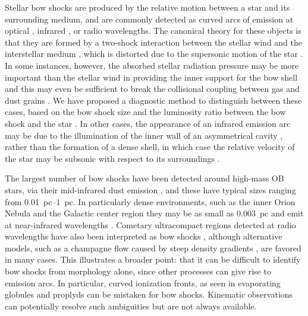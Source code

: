 \documentclass[useAMS, usenatbib, a4paper]{mnras}
\newcommand\hii{\ion{H}{ii}}
\begin{document}
Stellar bow shocks are produced by the relative motion between a star
and its surrounding medium, and are commonly detected as curved arcs
of emission at optical \citep{Gull:1979a, Brown:2005a}, infrared
\citep{van-Buren:1988a, Kobulnicky:2016a}, or radio
\citep{van-Buren:1990a, Benaglia:2010a} wavelengths.  The canonical
theory for these objects is that they are formed by a two-shock
interaction between the stellar wind and the interstellar medium
\citep{Pikelner:1968a, Dyson:1972a}, which is distorted due to the
supersonic motion of the star \citep{Baranov:1970a, Wilkin:1996a}.  In
some instances, however, the absorbed stellar radiation pressure may
be more important than the stellar wind in providing the inner support
for the bow shell \citep[Paper~I]{Henney:2019a} and this may even be
sufficient to break the collisional coupling between gas and dust
grains \citep[Paper~II]{Henney:2019b}.  We have proposed a diagnostic
method to distinguish between these cases, based on the bow shock size
and the luminosity ratio between the bow shock and the star
\citep[Paper~III]{Henney:2019c}. In other cases, the appearance of an
infrared emission arc may be due to the illumination of the inner wall
of an asymmetrical cavity \citep{Mackey:2016a}, rather than the
formation of a dense shell, in which case the relative velocity of the
star may be subsonic with respect to its surroundings
\citep{Mackey:2015a}.

The largest number of bow shocks have been detected around high-mass
OB stars, via their mid-infrared dust emission \citep{van-Buren:1995a,
  Noriega-Crespo:1997b, Povich:2008a, Kobulnicky:2010a, Peri:2012a,
  Peri:2015a, Sexton:2015b, Kobulnicky:2016a, Bodensteiner:2018a}, and
these have typical sizes ranging from \SIrange{0.01}{1}{pc}. In
particularly dense environments, such as the inner Orion Nebula
\citep{Smith:2005a} and the Galactic center region
\citep{Geballe:2004a} they may be as small as \SI{0.003}{pc} and emit
at near-infrared wavelengths \citep{Tanner:2005a,
  Sanchez-Bermudez:2014a}.  Cometary ultracompact \hii{} regions
detected at radio wavelengths \citep{Reid:1985a, Wood:1989a,
  Klaassen:2018a} have also been interpreted as bow shocks
\citep{van-Buren:1990a, Mac-Low:1991a}, although alternative models,
such as a champagne flow caused by steep density gradients
\citep{Cyganowski:2003a, Arthur:2006a, Immer:2014a, Steggles:2017a},
are favored in many cases.  This illustrates a broader point: that it
can be difficult to identify bow shocks from morphology alone, since
other processes can give rise to emission arcs.  In particular, curved
ionization fronts, as seen in evaporating globules \citep{Sahai:2012b}
and proplyds \citep{ODell:1993a} can be mistaken for bow shocks.
Kinematic observations can potentially resolve such ambiguities but
are not always available.
\end{document}
